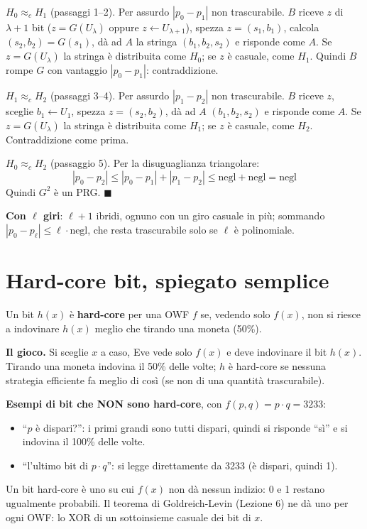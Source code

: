 \textbf{\(H_0 \approx_c H_1\)} (passaggi 1--2). Per assurdo \(|p_0 - p_1|\) non trascurabile. \(B\) riceve \(z\) di \(\lambda+1\) bit (\(z = G(U_\lambda)\) oppure \(z \leftarrow U_{\lambda+1}\)), spezza \(z = (s_1, b_1)\), calcola \((s_2, b_2) = G(s_1)\), dà ad \(A\) la stringa \((b_1, b_2, s_2)\) e risponde come \(A\). Se \(z = G(U_\lambda)\) la stringa è distribuita come \(H_0\); se \(z\) è casuale, come \(H_1\). Quindi \(B\) rompe \(G\) con vantaggio \(|p_0 - p_1|\): contraddizione.

\textbf{\(H_1 \approx_c H_2\)} (passaggi 3--4). Per assurdo \(|p_1 - p_2|\) non trascurabile. \(B\) riceve \(z\), sceglie \(b_1 \leftarrow U_1\), spezza \(z = (s_2, b_2)\), dà ad \(A\) \((b_1, b_2, s_2)\) e risponde come \(A\). Se \(z = G(U_\lambda)\) la stringa è distribuita come \(H_1\); se \(z\) è casuale, come \(H_2\). Contraddizione come prima.

\textbf{\(H_0 \approx_c H_2\)} (passaggio 5). Per la disuguaglianza triangolare:
\[
|p_0 - p_2| \le |p_0 - p_1| + |p_1 - p_2| \le \text{negl} + \text{negl} = \text{negl}
\]
Quindi \(G^2\) è un PRG. \(\blacksquare\)

\textbf{Con \(\ell\) giri}: \(\ell+1\) ibridi, ognuno con un giro casuale in più; sommando \(|p_0 - p_\ell| \le \ell \cdot \text{negl}\), che resta trascurabile solo se \(\ell\) è polinomiale.

\section{Hard-core bit, spiegato semplice}

\begin{inbreve}
Un bit \(h(x)\) è \textbf{hard-core} per una OWF \(f\) se, vedendo solo \(f(x)\), non si riesce a indovinare \(h(x)\) meglio che tirando una moneta (50\%).
\end{inbreve}

\textbf{Il gioco.} Si sceglie \(x\) a caso, Eve vede solo \(f(x)\) e deve indovinare il bit \(h(x)\). Tirando una moneta indovina il 50\% delle volte; \(h\) è hard-core se nessuna strategia efficiente fa meglio di così (se non di una quantità trascurabile).

\begin{esempio}
\textbf{Esempi di bit che NON sono hard-core}, con \(f(p, q) = p \cdot q = 3233\):
\begin{itemize}
  \item ``\(p\) è dispari?'': i primi grandi sono tutti dispari, quindi si risponde ``sì'' e si indovina il 100\% delle volte.
  \item ``l'ultimo bit di \(p \cdot q\)'': si legge direttamente da 3233 (è dispari, quindi 1).
\end{itemize}
Un bit hard-core è uno su cui \(f(x)\) non dà nessun indizio: 0 e 1 restano ugualmente probabili. Il teorema di Goldreich-Levin (Lezione 6) ne dà uno per ogni OWF: lo XOR di un sottoinsieme casuale dei bit di \(x\).
\end{esempio}

